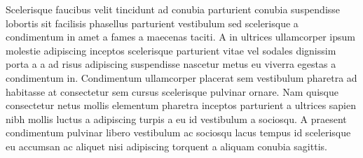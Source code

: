 Scelerisque faucibus velit tincidunt ad conubia parturient conubia suspendisse lobortis sit facilisis phasellus parturient vestibulum sed scelerisque a condimentum in amet a fames a maecenas taciti. A in ultrices ullamcorper ipsum molestie adipiscing inceptos scelerisque parturient vitae vel sodales dignissim porta a a ad risus adipiscing suspendisse nascetur metus eu viverra egestas a condimentum in. Condimentum ullamcorper placerat sem vestibulum pharetra ad habitasse at consectetur sem cursus scelerisque pulvinar ornare. Nam quisque consectetur netus mollis elementum pharetra inceptos parturient a ultrices sapien nibh mollis luctus a adipiscing turpis a eu id vestibulum a sociosqu. A praesent condimentum pulvinar libero vestibulum ac sociosqu lacus tempus id scelerisque eu accumsan ac aliquet nisi adipiscing torquent a aliquam conubia sagittis.